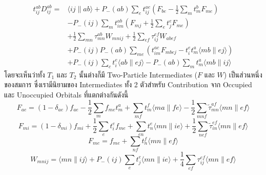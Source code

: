 \begin{equation}
  \label{eq:doubles_cluster_operator}
  \begin{aligned}
    t_{i j}^{a b} D_{i j}^{a b}
    =
     & \langle i j \| a b\rangle+P_{-}(a b) \sum_e t_{i j}^{a e}\left(F_{b e}
    - \frac{1}{2} \sum_m t_m^b F_{m e}\right)                                                              \\
     & - P_{-}(i j) \sum_m t_{i m}^{a b}\left(F_{m j} + \frac{1}{2} \sum_e t_j^e F_{m e}\right)            \\
     & + \frac{1}{2} \sum_{m n} \tau_{m n}^{a b} W_{m n i j}
    + \frac{1}{2} \sum_{e f} \tau_{i j}^{e f} W_{a b e f}                                                  \\
     & + P_{-}(i j) P_{-}(a b) \sum_{m e}\left(t_{i m}^{a c} F_{m b e j}
    - t_i^e t_m^a\langle m b \| e j\rangle\right)                                                          \\
     & + P_{-}(i j) \sum_c t_i^e\langle a b \| e j\rangle-P_{-}(a b) \sum_m t_m^a\langle m b \| i j\rangle
  \end{aligned}
\end{equation}
%
โดยจะเห็นว่าทั้ง $T_{1}$ และ $T_{2}$ นั้นต่างก็มี Two-Particle Intermediates ($F$ และ $W$) เป็นส่วนหนึ่งของสมการ ซึ่งเรามีนิยามของ Intermediates ทั้ง 2 ตัวสำหรับ Contribution จาก Occupied และ Unoccupied Orbitals ที่แตกต่างกันดังนี้
%
\begin{equation}
  \label{eq:F_ae}
  F_{a e}
  = \left(1-\delta_{a e}\right) f_{a e}-\frac{1}{2} \sum_m f_{m e} t_m^a
  + \sum_{m f} t_m^f\langle m a \| f e\rangle
  - \frac{1}{2} \sum_{m n f} \tilde{\tau}_{m n}^{a f}\langle m n \| e f\rangle
\end{equation}
%
\begin{equation}
  \label{eq:F_mi}
  F_{m i}
  = \left(1-\delta_{m i}\right) f_{m i}+\frac{1}{2} \sum_e t_i^e f_{m e}
  + \sum_{e n} t_n^e\langle m n \| i e\rangle
  + \frac{1}{2} \sum_{n e f} \tilde{\tau}_{i n}^{e f}\langle m n \| e f\rangle
\end{equation}
%
\begin{equation}
  \label{eq:F_me}
  F_{m e}
  =
  f_{m e}+\sum_{n f} t_n^f\langle m n \| e f\rangle
\end{equation}
%
\begin{equation}
  \label{eq:W_mnij}
  W_{m n i j}
  = \langle m n \| i j\rangle+P_{-}(i j) \sum_e t_j^e\langle m n \| i e\rangle
  + \frac{1}{4} \sum_{e f} \tau_{i j}^{e f}\langle m n \| e f\rangle
\end{equation}
